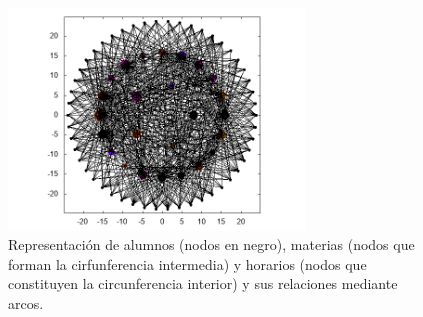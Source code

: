\documentclass{article}
\begin{document}
  \begin{figure}[h]
    \includegraphics[width=0.7\textwidth]{horarios}
    \centering
    \caption{Representación de alumnos (nodos en negro), materias (nodos que forman la cirfunferencia intermedia) y horarios (nodos que constituyen la circunferencia interior) y sus relaciones mediante arcos.}
    \label{fig:horarios}
  \end{figure}

  {}
  
\end{document}
